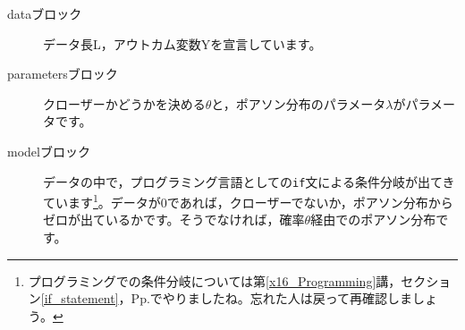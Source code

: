 \begin{description}
	\item[dataブロック] データ長L，アウトカム変数Yを宣言しています。
	\item[parametersブロック] クローザーかどうかを決める$\theta$と，ポアソン分布のパラメータ$\lambda$がパラメータです。
	\item[modelブロック] データの中で，プログラミング言語としての\verb|if|文による条件分岐が出てきています\footnote{プログラミングでの条件分岐については第\ref{x16_Programming}講，セクション\ref{if_statement}，Pp.\pageref{if_statement}でやりましたね。忘れた人は戻って再確認しましょう。}。データが0であれば，クローザーでないか，ポアソン分布からゼロが出ているかです。そうでなければ，確率$\theta$経由でのポアソン分布です。
\end{description}
